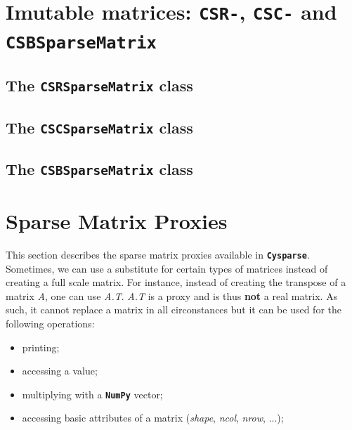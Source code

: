 \documentclass[letterpaper,10pt,english]{sphinxmanual}
\begin{document}
\chapter{Imutable matrices: \texttt{CSR-}, \texttt{CSC-} and \texttt{CSBSparseMatrix}}
\label{immutable_mat:immutable-mat}\label{immutable_mat::doc}\label{immutable_mat:imutable-matrices-csr-csc-and-csbsparsematrix}

\section{The \texttt{CSRSparseMatrix} class}
\label{immutable_mat:the-csrsparsematrix-class}

\section{The \texttt{CSCSparseMatrix} class}
\label{immutable_mat:the-cscsparsematrix-class}

\section{The \texttt{CSBSparseMatrix} class}
\label{immutable_mat:the-csbsparsematrix-class}

\chapter{Sparse Matrix Proxies}
\label{proxies:sparse-matrix-proxies}\label{proxies::doc}\label{proxies:id1}
This section describes the sparse matrix proxies available in
\textbf{\texttt{Cysparse}}. Sometimes, we can use a substitute for certain types of matrices instead of creating a full scale matrix. For instance, instead of creating the transpose of a matrix \emph{A}, one can use \emph{A.T}. \emph{A.T} is a
proxy and is thus \textbf{not} a real matrix. As such, it cannot replace a matrix in all circonstances but it can be used for the following operations:
\begin{itemize}
\item {} 
printing;

\item {} 
accessing a value;

\item {} 
multiplying with a \textbf{\texttt{NumPy}} vector;

\item {} 
accessing basic attributes of a matrix (\emph{shape}, \emph{ncol}, \emph{nrow}, ...);

\end{itemize}
\end{document}
